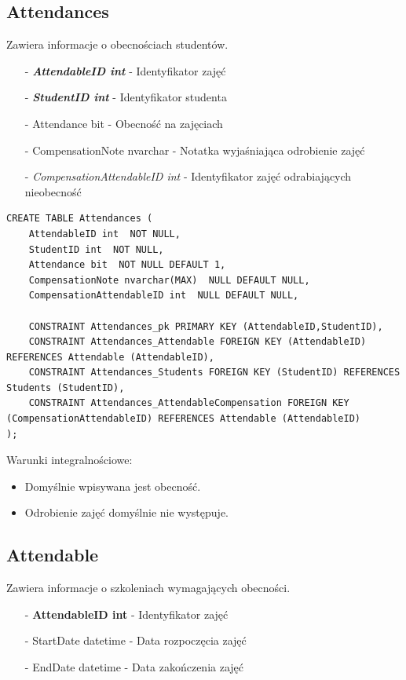 \documentclass[11pt,a4paper]{article}
\begin{document}
\subsection{Attendances}
Zawiera informacje o obecnościach studentów.

\begin{itemize}
    \item[-] \textbf{\textit{AttendableID int}} - Identyfikator zajęć
    \item[-] \textbf{\textit{StudentID int}} - Identyfikator studenta 
    \item[-] Attendance bit - Obecność na zajęciach
    \item[-] CompensationNote nvarchar - Notatka wyjaśniająca odrobienie zajęć
    \item[-] \textit{ CompensationAttendableID int} - Identyfikator zajęć odrabiających nieobecność 
\end{itemize}

\begin{Verbatim}[breaklines=true]
CREATE TABLE Attendances (
    AttendableID int  NOT NULL,
    StudentID int  NOT NULL,
    Attendance bit  NOT NULL DEFAULT 1,
    CompensationNote nvarchar(MAX)  NULL DEFAULT NULL,
    CompensationAttendableID int  NULL DEFAULT NULL,

    CONSTRAINT Attendances_pk PRIMARY KEY (AttendableID,StudentID),
    CONSTRAINT Attendances_Attendable FOREIGN KEY (AttendableID) REFERENCES Attendable (AttendableID),
    CONSTRAINT Attendances_Students FOREIGN KEY (StudentID) REFERENCES Students (StudentID),
    CONSTRAINT Attendances_AttendableCompensation FOREIGN KEY (CompensationAttendableID) REFERENCES Attendable (AttendableID)
);
\end{Verbatim}

Warunki integralnościowe:
\begin{itemize}
    \item Domyślnie wpisywana jest obecność.
    \item Odrobienie zajęć domyślnie nie występuje.
\end{itemize}

\subsection{Attendable}
Zawiera informacje o szkoleniach wymagających obecności.

\begin{itemize}
    \item[-] \textbf{AttendableID int} - Identyfikator zajęć 
    \item[-] StartDate datetime - Data rozpoczęcia zajęć
    \item[-] EndDate datetime - Data zakończenia zajęć
\end{itemize}
\end{document}
